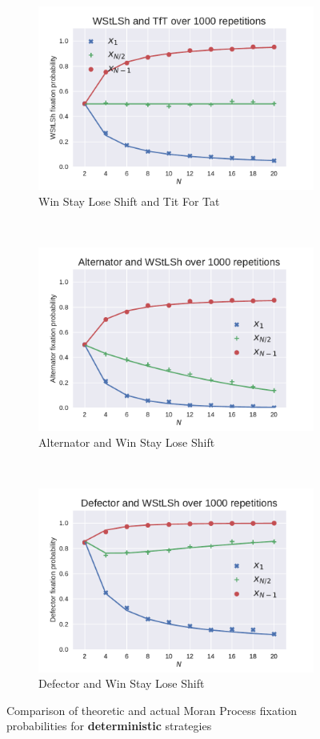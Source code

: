 \documentclass{article}
\begin{document}
\begin{figure}[!hbtp]
    \begin{subfigure}[t]{.3\textwidth}
        \centering
        \includegraphics[width=.8\textwidth]{./img/WStLSh_v_TfT.pdf}
        \caption{Win Stay Lose Shift and Tit For Tat}
    \end{subfigure}%
    ~
    \begin{subfigure}[t]{.3\textwidth}
        \centering
        \includegraphics[width=.8\textwidth]{./img/Alternator_v_WStLSh.pdf}
        \caption{Alternator and Win Stay Lose Shift}
    \end{subfigure}%
    ~
    \begin{subfigure}[t]{.3\textwidth}
        \centering
        \includegraphics[width=.8\textwidth]{./img/Defector_v_WStLSh.pdf}
        \caption{Defector and Win Stay Lose Shift}
    \end{subfigure}%
    \caption{Comparison of theoretic and actual Moran Process fixation
             probabilities for \textbf{deterministic} strategies}
    \label{fig:comparison_deterministic}
\end{figure}
\end{document}
